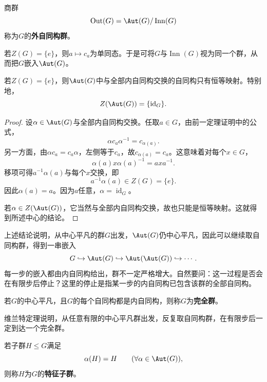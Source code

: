 \begin{definition}
商群
\[
\operatorname{Out}(G)=\Aut(G)/\operatorname{Inn}(G)
\]
称为$G$的\textbf{外自同构群}。
\end{definition}

若$Z(G)=\{e\}$，则$a\mapsto c_a$为单同态。于是可将$G$与$\operatorname{Inn}(G)$视为同一个群，从而把$G$嵌入$\Aut(G)$。

\begin{theorem}\label{p2:aut-centerless}
若$Z(G)=\{e\}$，则$\Aut(G)$中与全部内自同构交换的自同构只有恒等映射。特别地，
\[
Z(\Aut(G))=\{\operatorname{id}_G\}.
\]
\end{theorem}
\begin{proof}
设$\alpha\in\Aut(G)$与全部内自同构交换。任取$a\in G$，由前一定理证明中的公式，
\[
\alpha c_a\alpha^{-1}=c_{\alpha(a)}.
\]
另一方面，由$\alpha c_a=c_a\alpha$，左侧等于$c_a$，故$c_{\alpha(a)}=c_a$。这意味着对每个$x\in G$，
\[
\alpha(a)x\alpha(a)^{-1}=axa^{-1}.
\]
移项可得$a^{-1}\alpha(a)$与每个$x$交换，即
\[
a^{-1}\alpha(a)\in Z(G)=\{e\}.
\]
因此$\alpha(a)=a$。因为$a$任意，$\alpha=\operatorname{id}_G$。

若$\alpha\in Z(\Aut(G))$，它当然与全部内自同构交换，故也只能是恒等映射。这就得到所述中心的结论。
\end{proof}

上述结论说明，从中心平凡的群$G$出发，$\Aut(G)$仍中心平凡，因此可以继续取自同构群，得到一串嵌入
\[
G\hookrightarrow\Aut(G)\hookrightarrow\Aut(\Aut(G))\hookrightarrow\cdots.
\]
每一步的嵌入都由内自同构给出，群不一定严格增大。自然要问：这一过程是否会在有限步后停止？这里的停止是指某一步的内自同构已包含该群的全部自同构。

\begin{definition}
若$G$的中心平凡，且$G$的每个自同构都是内自同构，则称$G$为\textbf{完全群}。
\end{definition}

维兰特定理说明，从任意有限的中心平凡群出发，反复取自同构群，在有限步后一定到达一个完全群。

\begin{definition}
若子群$H\leq G$满足
\[
\alpha(H)=H\qquad(\forall\alpha\in\Aut(G)),
\]
则称$H$为$G$的\textbf{特征子群}。
\end{definition}

